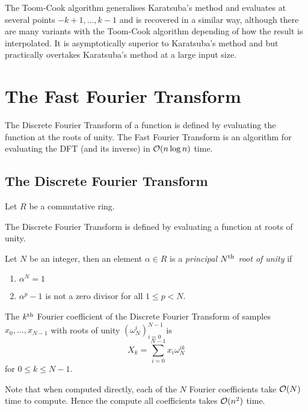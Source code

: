 The Toom-Cook algorithm generalises Karatsuba's method and evaluates at several points $-k + 1, \ldots, k - 1$ and is recovered in a similar way, although there are many variants with the Toom-Cook algorithm depending of how the result is interpolated. It is asymptotically superior to Karatsuba's method and but practically overtakes Karatsuba's method at a large input size.

\section{The Fast Fourier Transform}

The Discrete Fourier Transform of a function is defined by evaluating the function at the roots of unity. The Fast Fourier Transform is an algorithm for evaluating the DFT (and its inverse) in $\mathcal O(n \log n)$ time.

\subsection{The Discrete Fourier Transform}

Let $R$ be a commutative ring.

The Discrete Fourier Transform is defined by evaluating a function at roots of unity.

\begin{definition}
  Let $N$ be an integer, then an element $\alpha \in R$ is a \emph{principal $N^{\textrm{th}}$ root of unity} if
  \begin{enumerate}
    \item $\alpha^N = 1$
    \item $\alpha^p - 1$ is not a zero divisor for all $1 \leq p < N$.
  \end{enumerate}
\end{definition}


\begin{definition}
    The $k^{\textrm{th}}$ Fourier coefficient of the Discrete Fourier Transform of samples $x_0, \ldots, x_{N-1}$ with roots of unity $(\omega_N^i)_{i=0}^{N-1}$ is
\[
    X_k = \sum^{N-1}_{i=0}x_i\omega_{N}^{ik}
\]
for $0 \leq k \leq N-1$.
\end{definition}

Note that when computed directly, each of the $N$ Fourier coefficients take $\mathcal O(N)$ time to compute. Hence the compute all coefficients takes $\mathcal O(n^2)$ time.


